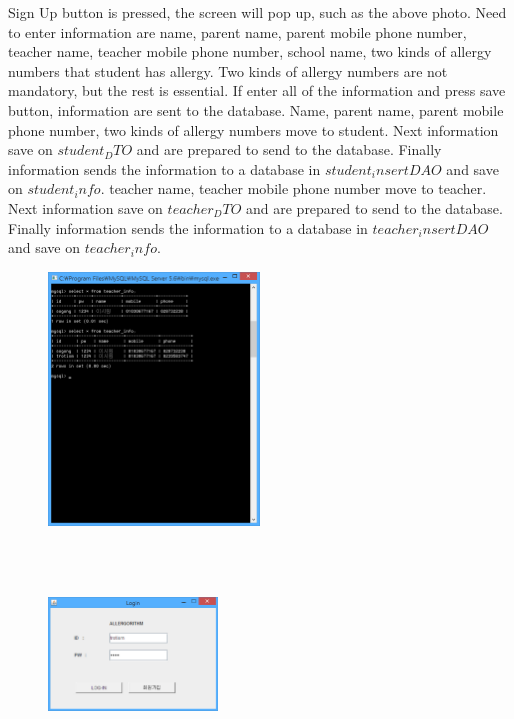 \documentclass[a4paper,11pt]{IEEEtran}
\begin{document}
{{{Sign Up button is pressed, the screen will pop up, such as the above photo. Need to enter information are name, parent name, parent mobile phone number, teacher name, teacher mobile phone number, school name, two kinds of allergy numbers that student has allergy. Two kinds of allergy numbers are not mandatory, but the rest is essential. If enter all of the information and press save button, information are sent to the database. Name, parent name, parent mobile phone number, two kinds of allergy numbers move to student. Next information save on $student_DTO$ and are prepared to send to the database. Finally information sends the information to a database in $student_insertDAO$ and save on $student_info$. teacher name, teacher mobile phone number move to teacher. Next information save on $teacher_DTO$ and are prepared to send to the database. Finally information sends the information to a database in $teacher_insertDAO$ and save on $teacher_info$.
~\\
\begin{figure}[!h]
        \centering
        \includegraphics[width=0.5\textwidth, height=0.5\textheight]{usec5.jpg}
        \caption{}
        \label{fig1}
\end{figure}
~\\
~\\
\newpage
\begin{figure}[!h]
        \centering
        \includegraphics[width=0.4\textwidth]{usec6.jpg}

\end{figure}}}}
\end{document}

